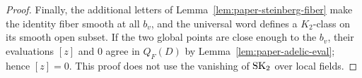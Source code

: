 \begin{proof}
Finally, the additional letters of Lemma~\ref{lem:paper-steinberg-fiber} make the identity fiber smooth at all $b_v$, and the universal word defines a $K_2$-class on its smooth open subset.
If the two global points are close enough to the $b_v$, their evaluations $[z]$ and $0$ agree in $Q_F(D)$ by Lemma~\ref{lem:paper-adelic-eval}; hence $[z]=0$.
This proof does not use the vanishing of $\operatorname{SK}_2$ over local fields.
\end{proof}

